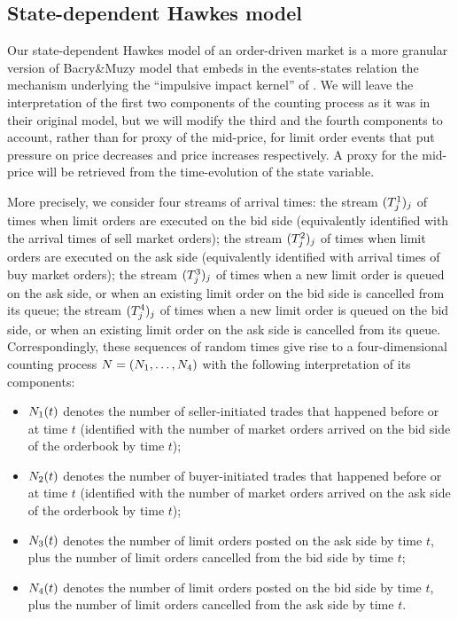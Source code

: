 \documentclass[10pt]{article}
\begin{document}
\subsection{State-dependent Hawkes model}\label{sec.sdHawkes_model}
Our state-dependent Hawkes model of an order-driven market is a more granular version of Bacry\&Muzy model that embeds in the events-states relation the mechanism underlying the ``impulsive impact kernel'' of \citealp{BM14haw}.
We will leave the interpretation of the first two components of the counting process as it was in their original model, but we will modify the third and the fourth components to account, rather than for proxy of the mid-price, for limit order events that put pressure on price decreases and price increases respectively. A proxy for the mid-price will be retrieved from the time-evolution of the state variable. 

More precisely, we consider four streams of arrival times: the stream $(\arrivalTimes[1]_j)_j$ of times when limit orders are executed on the bid side (equivalently identified with the arrival times of sell market orders); the stream  $(\arrivalTimes[2]_j)_j$ of times when limit orders are executed on the ask side (equivalently identified with arrival times of buy market orders); the stream  $(\arrivalTimes[3]_j)_j$ of times when a new limit order is queued on the ask side, or when an existing limit order on the bid side is cancelled from its queue; the stream  $(\arrivalTimes[4]_j)_j$ of times when a new limit order is queued on the bid side, or when an existing limit order on the ask side is cancelled from its queue. Correspondingly, these sequences of random times give rise to a four-dimensional counting process $\multiCountingProc=(\countingProc[1],\dots, \countingProc[4])$ with the following interpretation of its components:
\begin{itemize}
 \item $\countingProc[1](t)$ denotes the number of seller-initiated trades that happened before or at time $t$ (identified with the number of market orders arrived on the bid side of the orderbook by time $t$);
 \item $\countingProc[2](t)$ denotes the number of buyer-initiated trades that happened before or at time $t$ (identified with the number of market orders arrived on the ask side of the orderbook by time $t$);
 \item $\countingProc[3](t)$ denotes the number of limit orders posted on the ask side by time $t$, plus the number of limit orders cancelled from the bid side by time $t$;
 \item $\countingProc[4](t)$ denotes the number of limit orders posted on the bid side by time $t$, plus the number of limit orders cancelled from the ask side by time $t$.
\end{itemize}
\end{document}
